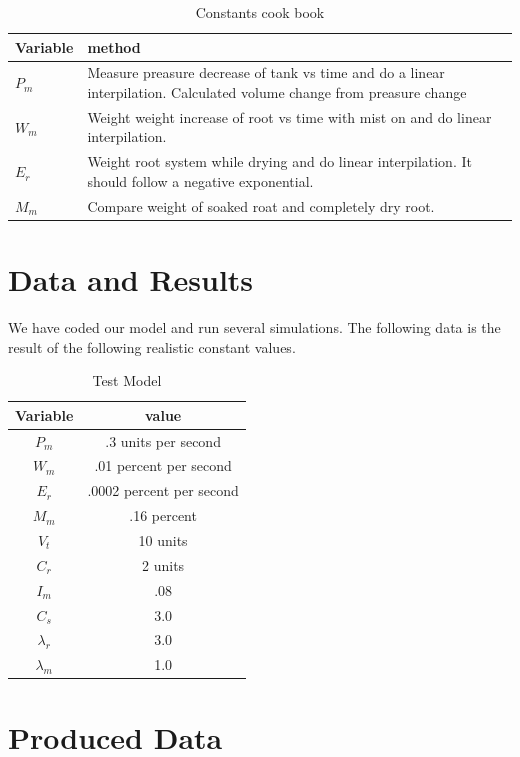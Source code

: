 \documentclass[a4paper,12pt]{article}
\begin{document}
\begin{table}[ht]
\caption{Constants cook book}
\centering
\begin{tabular} {p{1 cm} p{9cm}}
\hline\hline
 Variable & method \\ [0.5ex]
\hline
$P_m$ & Measure preasure decrease of tank vs time and do a linear interpilation. Calculated volume change from preasure change \\
$W_m$ & Weight weight increase of root vs time with mist on and do linear interpilation. \\
$E_r$ & Weight root system while drying and do linear interpilation. It should follow a negative exponential. \\ 
$M_m$ & Compare weight of soaked roat and completely dry root. \\ 
\hline
\end{tabular}
\end{table}


\section{Data and Results}

We have coded our model and run several simulations. The following data is the result of the following realistic constant values.


\begin{table}[ht]
\caption{Test Model}
\centering
\begin{tabular} {c c}
\hline\hline
 Variable & value \\ [0.5ex]
\hline
$P_m$ & .3 units per second\\
$W_m$ & .01 percent per second \\
$E_r$ & .0002 percent per second\\ 
$M_m$ & .16 percent \\ 
$V_t$ & 10 units \\
$C_r$ & 2 units \\
$I_m$ & .08 \\
$C_s$ & 3.0 \\
$\lambda_r$ & 3.0 \\
$\lambda_m$ & 1.0 \\ 
\hline
\end{tabular}
\end{table}

\section{Produced Data}
\end{document}

